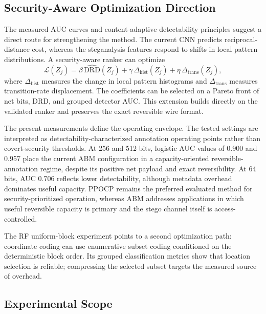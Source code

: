 \documentclass[a4paper,fleqn]{cas-dc}
\newcommand{\RevisionAddBegin}{\begingroup\color{revisionblue}}
\newcommand{\RevisionAddEnd}{\endgroup}
\begin{document}
\subsection{Security-Aware Optimization Direction}

\RevisionAddBegin
The measured AUC curves and content-adaptive detectability principles
\cite{Sedighi2018Content} suggest a direct route for strengthening the method.
The current CNN predicts reciprocal-distance cost, whereas the steganalysis
\RevisionAddEnd
features respond to shifts in local pattern distributions. A security-aware
ranker can optimize
\begin{equation}
\mathcal{L}(Z_j)=
\beta\,\widehat{\mathrm{DRD}}(Z_j)
+\gamma\,\Delta_{\mathrm{hist}}(Z_j)
+\eta\,\Delta_{\mathrm{trans}}(Z_j),
\label{eq:security-aware-ranker}
\end{equation}
where $\Delta_{\mathrm{hist}}$ measures the change in local pattern histograms
and $\Delta_{\mathrm{trans}}$ measures transition-rate displacement. The
coefficients can be selected on a Pareto front of net bits, DRD, and grouped
detector AUC. This extension builds directly on the validated ranker and
preserves the exact reversible wire format.

\RevisionAddBegin
The present measurements define the operating envelope. The tested settings
are interpreted as detectability-characterized annotation operating points
rather than covert-security thresholds. At 256 and 512 bits, logistic AUC
values of 0.900 and 0.957 place the current ABM configuration in a
capacity-oriented reversible-annotation regime, despite its positive net
payload and exact reversibility. At 64 bits, AUC 0.706 reflects lower
detectability, although metadata overhead dominates useful capacity. PPOCP remains the
\RevisionAddEnd
preferred evaluated method for security-prioritized operation, whereas ABM
addresses applications in which useful reversible capacity is primary and
the stego channel itself is access-controlled.

\RevisionAddBegin
The RF uniform-block experiment points to a second optimization path:
\RevisionAddEnd
coordinate coding can use enumerative subset coding conditioned on the
deterministic block order. Its grouped classification metrics show that
location selection is reliable; compressing the selected subset targets the
measured source of overhead.

\subsection{Experimental Scope}
\label{subsec:scope}
\end{document}
